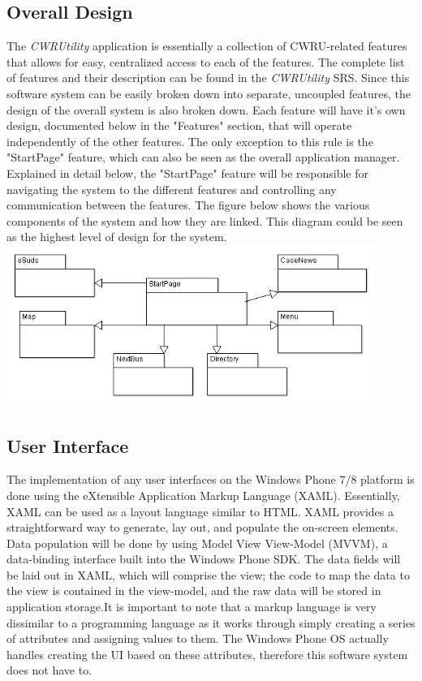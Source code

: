 \documentclass[pdftex,12pt,letter]{article}
\begin{document}
\subsection{Overall Design}
The \emph{CWRUtility} application is essentially a collection of CWRU-related features that allows for easy, centralized access to each of the features. The complete list of features and their description can be found in the \emph{CWRUtility} SRS. Since this software system can be easily broken down into separate, uncoupled features, the design of the overall system is also broken down. Each feature will have it's own design, documented below in the "Features" section, that will operate independently of the other features. The only exception to this rule is the "StartPage" feature, which can also be seen as the overall application manager. Explained in detail below, the "StartPage" feature will be responsible for navigating the system to the different features and controlling any communication between the features. The figure below shows the various components of the system and how they are linked. This diagram could be seen as the highest level of design for the system.
\includegraphics[width=120mm]{OverallCD.png}
\subsection{User Interface}
The implementation of any user interfaces on the Windows Phone 7/8 platform is done using the eXtensible Application Markup Language (XAML). Essentially, XAML can be used as a layout language similar to HTML. XAML provides a straightforward way to generate, lay out, and populate the on-screen elements. Data population will be done by using Model View View-Model (MVVM), a data-binding interface built into the Windows Phone SDK. The data fields will be laid out in XAML, which will comprise the view; the code to map the data to the view is contained in the view-model, and the raw data will be stored in application storage.It is important to note that a markup language is very dissimilar to a programming language as it works through simply creating a series of attributes and assigning values to them. The Windows Phone OS actually handles creating the UI based on these attributes, therefore this software system does not have to.
\\
\end{document}
